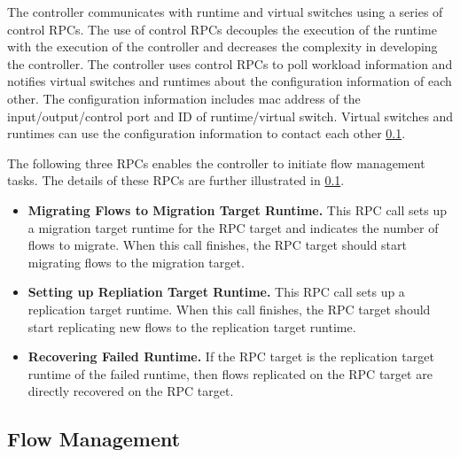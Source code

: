 The controller communicates with runtime and virtual switches using a series of control RPCs. The use of control RPCs decouples the execution of the runtime with the execution of the controller and decreases the complexity in developing the controller. The controller uses control RPCs to poll workload information and notifies virtual switches and runtimes about the configuration information of each other. The configuration information includes mac address of the input/output/control port and ID of runtime/virtual switch. Virtual switches and runtimes can use the configuration information to contact each other \ref{}.

The following three RPCs enables the controller to initiate flow management tasks. The details of these RPCs are further illustrated in \ref{}.

\begin{itemize}

\item \textbf{Migrating Flows to Migration Target Runtime.} This RPC call sets up a migration target runtime for the RPC target and indicates the number of flows to migrate. When this call finishes, the RPC target should start migrating flows to the migration target.


\item \textbf{Setting up Repliation Target Runtime.} This RPC call sets up a replication target runtime. When this call finishes, the RPC target should start replicating new flows to the replication target runtime.

\item \textbf{Recovering Failed Runtime.} If the RPC target is the replication target runtime of the failed runtime, then flows replicated on the RPC target are directly recovered on the RPC target.

\end{itemize}

\subsection{Flow Management}

